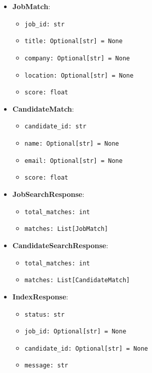 \begin{itemize}
    \item \textbf{JobMatch}:
    \begin{itemize}
        \item \texttt{job\_id: str}
        \item \texttt{title: Optional[str] = None}
        \item \texttt{company: Optional[str] = None}
        \item \texttt{location: Optional[str] = None}
        \item \texttt{score: float}
    \end{itemize}
    
    \item \textbf{CandidateMatch}:
    \begin{itemize}
        \item \texttt{candidate\_id: str}
        \item \texttt{name: Optional[str] = None}
        \item \texttt{email: Optional[str] = None}
        \item \texttt{score: float}
    \end{itemize}
    
    \item \textbf{JobSearchResponse}:
    \begin{itemize}
        \item \texttt{total\_matches: int}
        \item \texttt{matches: List[JobMatch]}
    \end{itemize}
    
    \item \textbf{CandidateSearchResponse}:
    \begin{itemize}
        \item \texttt{total\_matches: int}
        \item \texttt{matches: List[CandidateMatch]}
    \end{itemize}
    
    \item \textbf{IndexResponse}:
    \begin{itemize}
        \item \texttt{status: str}
        \item \texttt{job\_id: Optional[str] = None}
        \item \texttt{candidate\_id: Optional[str] = None}
        \item \texttt{message: str}
    \end{itemize}
    

\end{itemize}
